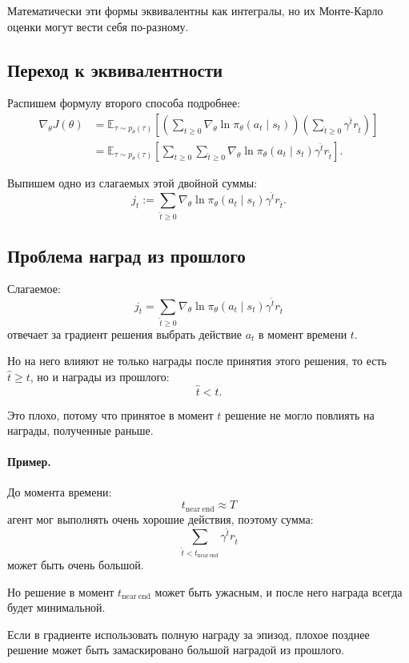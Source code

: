 \documentclass[12pt,a4paper]{article}
\begin{document}
Математически эти формы эквивалентны как интегралы, но их Монте-Карло оценки могут вести себя по-разному.

\subsection{Переход к эквивалентности}

Распишем формулу второго способа подробнее:
\[
\begin{aligned}
\nabla_\theta J(\theta)
&=
\mathbb E_{\tau\sim p_\theta(\tau)}
\left[
\left(
\sum_{t\ge 0}
\nabla_\theta
\ln \pi_\theta(a_t\mid s_t)
\right)
\left(
\sum_{\hat t\ge 0}
\gamma^{\hat t} r_{\hat t}
\right)
\right]
\\
&=
\mathbb E_{\tau\sim p_\theta(\tau)}
\left[
\sum_{t\ge 0}
\sum_{\hat t\ge 0}
\nabla_\theta
\ln \pi_\theta(a_t\mid s_t)
\gamma^{\hat t} r_{\hat t}
\right].
\end{aligned}
\]

Выпишем одно из слагаемых этой двойной суммы:
\[
j_t
:=
\sum_{\hat t\ge 0}
\nabla_\theta
\ln \pi_\theta(a_t\mid s_t)
\gamma^{\hat t} r_{\hat t}.
\]

\subsection{Проблема наград из прошлого}

Слагаемое:
\[
j_t
=
\sum_{\hat t\ge 0}
\nabla_\theta
\ln \pi_\theta(a_t\mid s_t)
\gamma^{\hat t} r_{\hat t}
\]
отвечает за градиент решения выбрать действие $a_t$ в момент времени $t$.

Но на него влияют не только награды после принятия этого решения, то есть $\hat t\ge t$, но и награды из прошлого:
\[
\hat t<t.
\]

Это плохо, потому что принятое в момент $t$ решение не могло повлиять на награды, полученные раньше.

\paragraph{Пример.}

До момента времени:
\[
t_{\mathrm{near\ end}}\approx T
\]
агент мог выполнять очень хорошие действия, поэтому сумма:
\[
\sum_{\hat t<t_{\mathrm{near\ end}}}
\gamma^{\hat t}r_{\hat t}
\]
может быть очень большой.

Но решение в момент $t_{\mathrm{near\ end}}$ может быть ужасным, и после него награда всегда будет минимальной.

Если в градиенте использовать полную награду за эпизод, плохое позднее решение может быть замаскировано большой наградой из прошлого.
\end{document}
